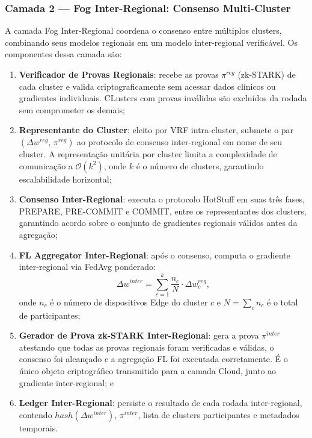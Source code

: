 \documentclass[12pt]{article}
\begin{document}
\subsubsection{Camada 2 — Fog Inter-Regional: Consenso Multi-Cluster}

A camada Fog Inter-Regional coordena o consenso entre múltiplos clusters, combinando seus modelos regionais em um modelo inter-regional verificável. Os componentes dessa camada são:

\begin{enumerate}
    \item \textbf{Verificador de Provas Regionais}: recebe as provas $\pi^{{reg}}$ (zk-STARK) de cada cluster e valida criptograficamente sem acessar dados clínicos ou gradientes individuais. CLusters com provas inválidas são excluídos da rodada sem comprometer os demais;
    \item \textbf{Representante do Cluster}: eleito por VRF intra-cluster, submete o par $(\Delta w^{{reg}},\, \pi^{{reg}})$ ao protocolo de consenso inter-regional em nome de seu cluster. A representação unitária por cluster limita a complexidade de comunicação a $\mathcal{O}(k^2)$, onde $k$ é o número de clusters, garantindo escalabilidade horizontal;
    \item \textbf{Consenso Inter-Regional}: executa o protocolo HotStuff em suas três fases, PREPARE, PRE-COMMIT e COMMIT, entre os representantes dos clusters, garantindo acordo sobre o conjunto de gradientes regionais válidos antes da agregação;
    \item \textbf{FL Aggregator Inter-Regional}: após o consenso, computa o gradiente inter-regional via FedAvg ponderado:
    \[
    \Delta w^{inter} = \sum_{c=1}^{k} \frac{n_c}{N} \cdot \Delta w_c^{reg},
    \]
    onde $n_c$ é o número de dispositivos Edge do cluster $c$ e $N = \sum_c n_c$ é o total de participantes;
    \item \textbf{Gerador de Prova zk-STARK Inter-Regional}: gera a prova $\pi^{{inter}}$ atestando que todas as provas regionais foram verificadas e válidas, o consenso foi alcançado e a agregação FL foi executada corretamente. É o único objeto criptográfico transmitido para a camada Cloud, junto ao gradiente inter-regional; e
    \item \textbf{Ledger Inter-Regional}: persiste o resultado de cada rodada inter-regional, contendo ${hash}(\Delta w^{{inter}})$, $\pi^{inter}$, lista de clusters participantes e metadados temporais. 
\end{enumerate}
\end{document}
